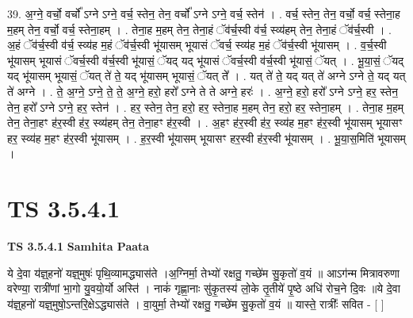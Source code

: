 \documentclass[17pt]{extarticle}
\begin{document}
39. अ॒ग्ने॒ वर्चो॒ वर्चो᳚ ऽग्ने ऽग्ने॒ वर्च॒ स्तेन॒ तेन॒ वर्चो᳚ ऽग्ने ऽग्ने॒ वर्च॒ स्तेन॑ । . वर्च॒ स्तेन॒ तेन॒ वर्चो॒ वर्च॒ स्तेना॒ह म॒हम् तेन॒ वर्चो॒ वर्च॒ स्तेना॒हम् । . तेना॒ह म॒हम् तेन॒ तेना॒हं ॅव॑र्च॒स्वी व॑र्च॒ स्व्य॑हम् तेन॒ तेना॒हं ॅव॑र्च॒स्वी । . अ॒हं ॅव॑र्च॒स्वी व॑र्च॒ स्व्य॑ह म॒हं ॅव॑र्च॒स्वी भू॑यासम् भूयासं ॅवर्च॒ स्व्य॑ह म॒हं ॅव॑र्च॒स्वी भू॑यासम् । . व॒र्च॒स्वी भू॑यासम् भूयासं ॅवर्च॒स्वी व॑र्च॒स्वी भू॑यासं॒ ॅयद् यद् भू॑यासं ॅवर्च॒स्वी व॑र्च॒स्वी भू॑यासं॒ ॅयत् । . भू॒या॒सं॒ ॅयद् यद् भू॑यासम् भूयासं॒ ॅयत् ते॑ ते॒ यद् भू॑यासम् भूयासं॒ ॅयत् ते᳚ । . यत् ते॑ ते॒ यद् यत् ते॑ अग्ने ऽग्ने ते॒ यद् यत् ते॑ अग्ने । . ते॒ अ॒ग्ने॒ ऽग्ने॒ ते॒ ते॒ अ॒ग्ने॒ हरो॒ हरो᳚ ऽग्ने ते ते अग्ने॒ हरः॑ । . अ॒ग्ने॒ हरो॒ हरो᳚ ऽग्ने ऽग्ने॒ हर॒ स्तेन॒ तेन॒ हरो᳚ ऽग्ने ऽग्ने॒ हर॒ स्तेन॑ । . हर॒ स्तेन॒ तेन॒ हरो॒ हर॒ स्तेना॒ह म॒हम् तेन॒ हरो॒ हर॒ स्तेना॒हम् । . तेना॒ह म॒हम् तेन॒ तेना॒हꣳ ह॑र॒स्वी ह॑र॒ स्व्य॑हम् तेन॒ तेना॒हꣳ ह॑र॒स्वी । . अ॒हꣳ ह॑र॒स्वी ह॑र॒ स्व्य॑ह म॒हꣳ ह॑र॒स्वी भू॑यासम् भूयासꣳ हर॒ स्व्य॑ह म॒हꣳ ह॑र॒स्वी भू॑यासम् । . ह॒र॒स्वी भू॑यासम् भूयासꣳ हर॒स्वी ह॑र॒स्वी भू॑यासम् । . भू॒या॒स॒मिति॑ भूयासम् । \newline
\pagebreak
{}

\section{ TS 3.5.4.1 }

\textbf{TS 3.5.4.1 } \newline
\textbf{Samhita Paata} \newline

ये दे॒वा य॑ज्ञ्॒हनो॑ यज्ञ्॒मुषः॑ पृथि॒व्यामद्ध्यास॑ते ।अ॒ग्निर्मा॒ तेभ्यो॑ रक्षतु॒ गच्छे॑म सु॒कृतो॑ व॒यं ॥ आऽग॑न्म मित्रावरुणा वरेण्या॒ रात्री॑णां भा॒गो यु॒वयो॒र्यो अस्ति॑ । नाकं॑ गृह्णा॒नाः सु॑कृ॒तस्य॑ लो॒के तृ॒तीये॑ पृ॒ष्ठे अधि॑ रोच॒ने दि॒वः ॥ये दे॒वा य॑ज्ञ्॒हनो॑ यज्ञ्॒मुषो॒ऽन्तरि॒क्षेऽद्ध्यास॑ते । वा॒युर्मा॒ तेभ्यो॑ रक्षतु॒ गच्छे॑म सु॒कृतो॑ व॒यं ॥ यास्ते॒ रात्रीः᳚ सवित - [  ] \newline
\end{document}
